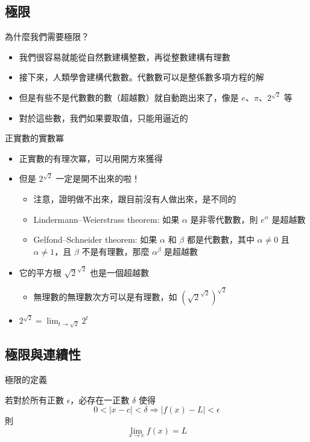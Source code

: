 \documentclass{beamer}
\begin{document}
\begin{CJK}{UTF8}{bsmi}
\section{極限}
\begin{frame}{為什麼我們需要極限？}
  \begin{itemize}
    \item 我們很容易就能從自然數建構整數，再從整數建構有理數
    \item 接下來，人類學會建構代數數。代數數可以是整係數多項方程的解
    \item 但是有些不是代數數的數（超越數）就自動跑出來了，像是 $e$、$\pi$、$2^{\sqrt2}$ 等
    \item 對於這些數，我們如果要取值，只能用逼近的
  \end{itemize}
\end{frame}

\begin{frame}{正實數的實數冪}
  \begin{itemize}
    \item 正實數的有理次冪，可以用開方來獲得
    \item 但是 $2^{\sqrt2}$ 一定是開不出來的啦！
      \begin{itemize}
	\item 注意，證明做不出來，跟目前沒有人做出來，是不同的
	\item Lindermann--Weierstrass theorem: 如果 $\alpha$ 是非零代數數，則 $e^\alpha$ 是超越數
	\item Gelfond--Schneider theorem: 如果 $\alpha$ 和 $\beta$ 都是代數數，其中 $\alpha \ne 0$ 且 $\alpha \ne 1$，且 $\beta$
	    不是有理數，那麼 $\alpha^\beta$ 是超越數
      \end{itemize}
    \item 它的平方根 $\sqrt2^{\sqrt2}$ 也是一個超越數
      \begin{itemize}
	\item 無理數的無理數次方可以是有理數，如 $\left(\sqrt2^{\sqrt2}\right)^{\sqrt2}$
      \end{itemize}
    \item $\displaystyle 2^{\sqrt2} = \lim_{t\to\sqrt2} 2^t$
  \end{itemize}
\end{frame}

\subsection{極限與連續性}
\begin{frame}{極限的定義}
  \begin{definition}
    若對於所有正數 $\epsilon$，必存在一正數 $\delta$ 使得
    \[0 < |x-c| < \delta \Rightarrow |f(x) - L| < \epsilon\]
    則
    \[\lim_{x \to c} f(x) = L\]
  \end{definition}
\end{frame}


\end{CJK}
\end{document}
